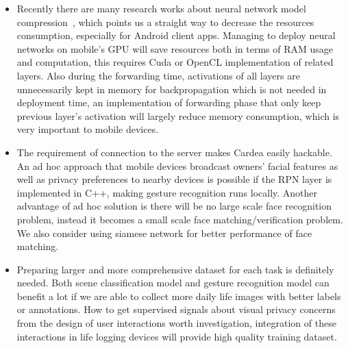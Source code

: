 \begin{itemize}

\item Recently there are many research works about neural network model compression~\cite{han2015deep}, which points us a straight way to decrease the resources consumption, especially for Android client apps. Managing to deploy neural networks on mobile's GPU will save resources both in terms of RAM usage and computation, this requires Cuda or OpenCL implementation of related layers. Also during the forwarding time, activations of all layers are unnecessarily kept in memory for backpropagation which is not needed in deployment time, an implementation of forwarding phase that only keep previous layer's activation will largely reduce memory consumption, which is very important to mobile devices.
\item The requirement of connection to the server makes Cardea easily hackable. An ad hoc approach that mobile devices broadcast owners' facial features as well as privacy preferences to nearby devices is possible if the RPN layer is implemented in C++, making gesture recognition runs locally. Another advantage of ad hoc solution is there will be no large scale face recognition problem, instead it becomes a small scale face matching/verification problem. We also consider using siamese network for better performance of face matching.
\item Preparing larger and more comprehensive dataset for each task is definitely needed. Both scene classification model and gesture recognition model can benefit a lot if we are able to collect more daily life images with better labels or annotations. How to get supervised signals about visual privacy concerns from the design of user interactions worth investigation, integration of these interactions in life logging devices will provide high quality training dataset.

\end{itemize}



\newpage
